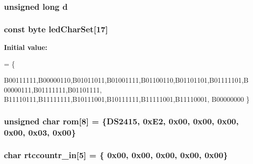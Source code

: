 \hypertarget{OWGeneric__DangerShield_8ino_a22871ee78191bcd7676a38358795104e}{
\subsubsection[{d}]{\setlength{\rightskip}{0pt plus 5cm}unsigned long d}}\label{OWGeneric__DangerShield_8ino_a22871ee78191bcd7676a38358795104e}
\hypertarget{OWGeneric__DangerShield_8ino_a9fd6363d57e3788ec90445fb8f7e46e6}{
\subsubsection[{led\-Char\-Set}]{\setlength{\rightskip}{0pt plus 5cm}const byte led\-Char\-Set\mbox{[}17\mbox{]}}}\label{OWGeneric__DangerShield_8ino_a9fd6363d57e3788ec90445fb8f7e46e6}
{\bfseries Initial value\-:}
\begin{DoxyCode}
= \{

  B00111111,B00000110,B01011011,B01001111,B01100110,B01101101,B01111101,B00000111,B01111111,B01101111, 
  B11110111,B11111111,B10111001,B10111111,B11111001,B11110001,
  B00000000
\}
\end{DoxyCode}
\hypertarget{OWGeneric__DangerShield_8ino_a8beb78e2b3f2cb6e34f34861a875ca0b}{
\subsubsection[{rom}]{\setlength{\rightskip}{0pt plus 5cm}unsigned char rom\mbox{[}8\mbox{]} = \{D\-S2415, 0x\-E2, 0x00, 0x00, 0x00, 0x00, 0x03, 0x00\}}}\label{OWGeneric__DangerShield_8ino_a8beb78e2b3f2cb6e34f34861a875ca0b}
\hypertarget{OWGeneric__DangerShield_8ino_a81a94fdcf5fd0721c26e50dd4cd32b1e}{
\subsubsection[{rtccountr\-\_\-in}]{\setlength{\rightskip}{0pt plus 5cm}char rtccountr\-\_\-in\mbox{[}5\mbox{]} = \{ 0x00, 0x00, 0x00, 0x00, 0x00\}}}\label{OWGeneric__DangerShield_8ino_a81a94fdcf5fd0721c26e50dd4cd32b1e}
